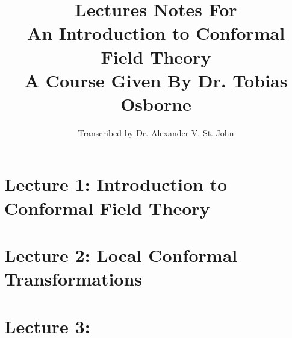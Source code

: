 \documentclass[10pt]{article}
\title{Lectures Notes For \\ An Introduction to Conformal Field Theory \\ A Course Given By Dr. Tobias Osborne}
\author{Transcribed by Dr. Alexander V. St. John}
\begin{document}
\maketitle

\clearpage

\section*{Lecture 1: Introduction to Conformal Field Theory}
\label{sec: lec1}



\clearpage

\section*{Lecture 2: Local Conformal Transformations}
\label{sec: lec2}



\clearpage

\section*{Lecture 3: }
\label{sec: lec3}

%

\end{document}
